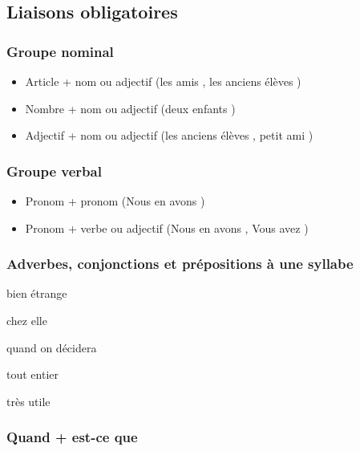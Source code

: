 \documentclass{article}
\begin{document}
\subsection{Liaisons obligatoires}

\subsubsection{Groupe nominal}

\begin{itemize}
\item Article + nom ou adjectif (les amis \textipa{[lE za mi]}, les anciens élèves \textipa{[lE z\~a si j\~E ze lEv]})
\item Nombre + nom ou adjectif (deux enfants \textipa{[d\o \ z\~a f\~a]})
\item Adjectif + nom ou adjectif (les anciens élèves \textipa{[lE z\~a si j\~E ze lEv]}, petit ami \textipa{[p@ ti ta mi]})
\end{itemize}


\subsubsection{Groupe verbal}

\begin{itemize}
\item Pronom + pronom (Nous en avons \textipa{[nu z\~a na v\~O]})
\item Pronom + verbe ou adjectif (Nous en avons \textipa{[nu z\~a na v\~O]}, Vous avez \textipa{[nu za ve]})
\end{itemize}

\subsubsection{Adverbes, conjonctions et prépositions à une syllabe}

bien étrange \textipa{[bj\~E ne tr\~a Z]}

chez elle \textipa{[Se zEl]}

quand on décidera \textipa{[k\~a t\~O de si d@ ra]}

tout entier \textipa{[tu t\~a ti tje]}

très utile 	


\subsubsection{Quand + est-ce que }
\end{document}
